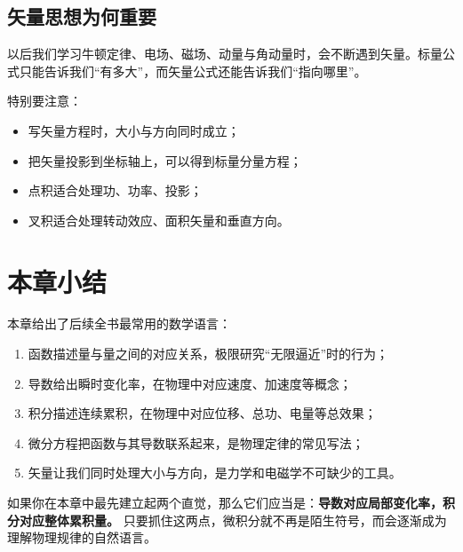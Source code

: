 \subsection{矢量思想为何重要}

以后我们学习牛顿定律、电场、磁场、动量与角动量时，会不断遇到矢量。标量公式只能告诉我们“有多大”，而矢量公式还能告诉我们“指向哪里”。

特别要注意：
\begin{itemize}
  \item 写矢量方程时，大小与方向同时成立；
  \item 把矢量投影到坐标轴上，可以得到标量分量方程；
  \item 点积适合处理功、功率、投影；
  \item 叉积适合处理转动效应、面积矢量和垂直方向。
\end{itemize}

\section*{本章小结}

本章给出了后续全书最常用的数学语言：
\begin{enumerate}
  \item 函数描述量与量之间的对应关系，极限研究“无限逼近”时的行为；
  \item 导数给出瞬时变化率，在物理中对应速度、加速度等概念；
  \item 积分描述连续累积，在物理中对应位移、总功、电量等总效果；
  \item 微分方程把函数与其导数联系起来，是物理定律的常见写法；
  \item 矢量让我们同时处理大小与方向，是力学和电磁学不可缺少的工具。
\end{enumerate}

如果你在本章中最先建立起两个直觉，那么它们应当是：\textbf{导数对应局部变化率，积分对应整体累积量。} 只要抓住这两点，微积分就不再是陌生符号，而会逐渐成为理解物理规律的自然语言。

